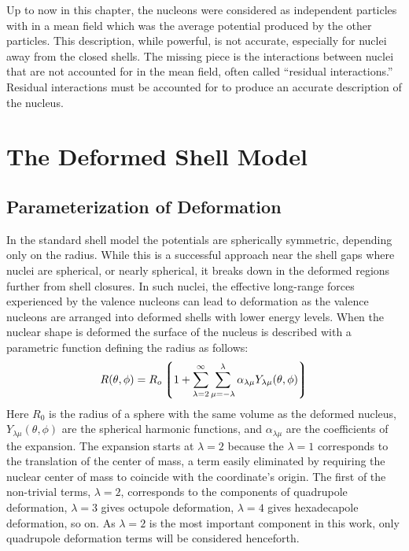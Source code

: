 Up to now in this chapter, the nucleons were considered as independent particles with in a mean field which was the average potential produced by the other particles. This description, while powerful, is not accurate, especially for nuclei away from the closed shells. The missing piece is the interactions between nuclei that are not accounted for in the mean field, often called ``residual interactions.'' Residual interactions must be accounted for to produce an accurate description of the nucleus.

\section{The Deformed Shell Model}
\label{sec:models-shell-model-def-sm}
\subsection{Parameterization of Deformation}
\label{ssec:models-shell-model-def-param}
In the standard shell model the potentials are spherically symmetric, depending only on the radius. While this is a successful approach near the shell gaps where nuclei are spherical, or nearly spherical, it breaks down in the deformed regions further from shell closures. In such nuclei, the effective long-range forces experienced by the valence nucleons can lead to deformation as the valence nucleons are arranged into deformed shells with lower energy levels. When the nuclear shape is deformed the surface of the nucleus is described with a parametric function defining the radius as follows:
\begin{equation}
\label{eqn:surface-full-expansion}
R(\theta, \phi) = R_{o}\left \lgroup 1 + \sum_{\lambda = 2}^{\infty}\sum_{\mu = -\lambda}^{\lambda}\alpha_{\lambda \mu} Y_{\lambda \mu}(\theta, \phi)\right \rgroup
\end{equation} 
Here $R_0$ is the radius of a sphere with the same volume as the deformed nucleus, $Y_{\lambda \mu}(\theta, \phi)$ are the spherical harmonic functions, and $\alpha_{\lambda \mu}$ are the coefficients of the expansion. The expansion starts at $\lambda = 2$ because the $\lambda = 1$ corresponds to the translation of the center of mass, a term easily eliminated by requiring the nuclear center of mass to coincide with the coordinate's origin. The first of the non-trivial terms, $\lambda = 2$, corresponds to the components of quadrupole deformation, $\lambda = 3$ gives octupole deformation, $\lambda = 4$ gives hexadecapole deformation, so on. As $\lambda = 2$ is the most important component in this work, only quadrupole deformation terms will be considered henceforth.

